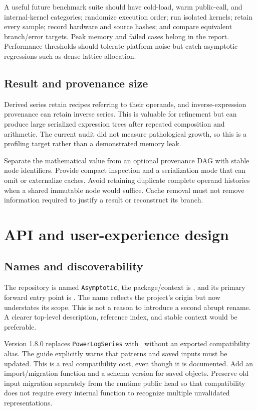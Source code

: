 A useful future benchmark suite should have cold-load, warm public-call, and internal-kernel categories; randomize execution order; run isolated kernels; retain every sample; record hardware and source hashes; and compare equivalent branch/error targets. Peak memory and failed cases belong in the report. Performance thresholds should tolerate platform noise but catch asymptotic regressions such as dense lattice allocation.

\subsection{Result and provenance size}

Derived series retain recipes referring to their operands, and inverse-expression provenance can retain inverse series. This is valuable for refinement but can produce large serialized expression trees after repeated composition and arithmetic. The current audit did not measure pathological growth, so this is a profiling target rather than a demonstrated memory leak.\cite{operations,inverseexpressions}

Separate the mathematical value from an optional provenance DAG with stable node identifiers. Provide compact inspection and a serialization mode that can omit or externalize caches. Avoid retaining duplicate complete operand histories when a shared immutable node would suffice. Cache removal must not remove information required to justify a result or reconstruct its branch.

\section{API and user-experience design}
\label{sec:api}

\subsection{Names and discoverability}

The repository is named \texttt{Asymptotic}, the package/context is \pkg, and its primary forward entry point is . The name reflects the project's origin but now understates its scope. This is not a reason to introduce a second abrupt rename. A clearer top-level description, reference index, and stable context would be preferable.\cite{guide,paclet}

Version 1.8.0 replaces \texttt{PowerLogSeries} with \gseries\ without an exported compatibility alias. The guide explicitly warns that patterns and saved inputs must be updated. This is a real compatibility cost, even though it is documented. Add an import/migration function and a schema version for saved objects. Preserve old input migration separately from the runtime public head so that compatibility does not require every internal function to recognize multiple unvalidated representations.\cite{guide,validation}

